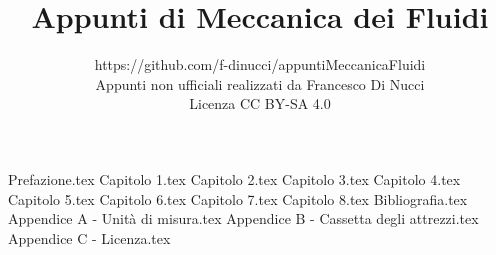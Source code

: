 \documentclass[11pt,a4paper]{book}
\begin{document}
 
\title{Appunti di Meccanica dei Fluidi}
\author{https://github.com/f-dinucci/appuntiMeccanicaFluidi \\ Appunti non ufficiali realizzati da Francesco Di Nucci \\ Licenza CC BY-SA 4.0}
\maketitle
{Prefazione.tex}
\tableofcontents{} 
%
{Capitolo 1.tex}
{Capitolo 2.tex}
{Capitolo 3.tex}
{Capitolo 4.tex}
{Capitolo 5.tex}
{Capitolo 6.tex}
{Capitolo 7.tex}
{Capitolo 8.tex}
{Bibliografia.tex}
{Appendice A - Unità di misura.tex}
{Appendice B - Cassetta degli attrezzi.tex}
{Appendice C - Licenza.tex}
\end{document}
